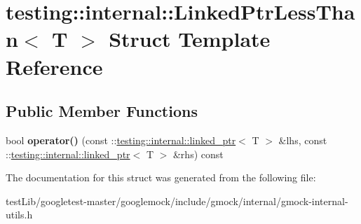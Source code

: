 \hypertarget{structtesting_1_1internal_1_1LinkedPtrLessThan}{}\section{testing\+:\+:internal\+:\+:Linked\+Ptr\+Less\+Than$<$ T $>$ Struct Template Reference}
\label{structtesting_1_1internal_1_1LinkedPtrLessThan}
\subsection*{Public Member Functions}
\begin{DoxyCompactItemize}
\item 
\mbox{\label{structtesting_1_1internal_1_1LinkedPtrLessThan_a0614293c43e51b280a870ab117355164}} 
bool {\bfseries operator()} (const \+::\hyperlink{classtesting_1_1internal_1_1linked__ptr}{testing\+::internal\+::linked\+\_\+ptr}$<$ T $>$ \&lhs, const \+::\hyperlink{classtesting_1_1internal_1_1linked__ptr}{testing\+::internal\+::linked\+\_\+ptr}$<$ T $>$ \&rhs) const
\end{DoxyCompactItemize}


The documentation for this struct was generated from the following file\+:\begin{DoxyCompactItemize}
\item 
test\+Lib/googletest-\/master/googlemock/include/gmock/internal/gmock-\/internal-\/utils.\+h\end{DoxyCompactItemize}

